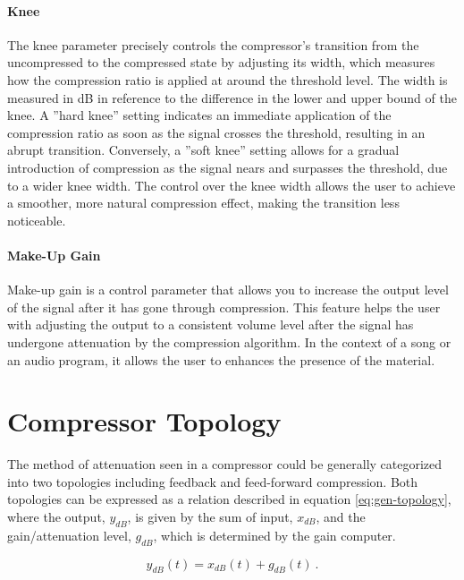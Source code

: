 \documentclass[10pt]{article}
\begin{document}
\begin{multicols*}{2}
            \paragraph{Knee}
                The knee parameter precisely controls the compressor's transition from the uncompressed to the compressed state by adjusting its width, which measures how the compression ratio is applied at around the threshold level. The width is measured in dB in reference to the difference in the lower and upper bound of the knee. A ''hard knee'' setting indicates an immediate application of the compression ratio as soon as the signal crosses the threshold, resulting in an abrupt transition. Conversely, a ''soft knee'' setting allows for a gradual introduction of compression as the signal nears and surpasses the threshold, due to a wider knee width. The control over the knee width allows the user to achieve a smoother, more natural compression effect, making the transition less noticeable.
            
            \paragraph{Make-Up Gain}
                Make-up gain is a control parameter that allows you to increase the output level of the signal after it has gone through compression. This feature helps the user with adjusting the output to a consistent volume level after the signal has undergone attenuation by the compression algorithm. In the context of a song or an audio program, it allows the user to enhances the presence of the material.

        \section{Compressor Topology} \label{sec:comp-tpgy}
            The method of attenuation seen in a compressor could be generally categorized into two topologies including feedback and feed-forward compression. Both topologies can be expressed as a relation described in equation \ref{eq:gen-topology}, where the output, $y_{dB}$, is given by the sum of input, $x_{dB}$, and the gain/attenuation level, $g_{dB}$, which is determined by the gain computer. 

                \begin{equation} \label{eq:gen-topology}
                    y_{dB}(t)=x_{dB}(t)+g_{dB}(t)\ .
                \end{equation}
            

\end{multicols*}
\end{document}
